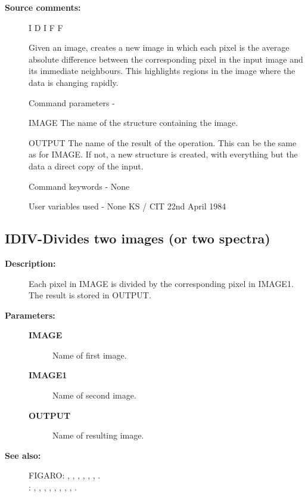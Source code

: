 \begin{description}
\begin{description}
\item [\textbf{Source comments:}]
\begin{terminalv}
 I D I F F

 Given an image, creates a new image in which each pixel
 is the average absolute difference between the corresponding
 pixel in the input image and its immediate neighbours.  This
 highlights regions in the image where the data is changing
 rapidly.

 Command parameters -

 IMAGE  The name of the structure containing the image.

 OUTPUT The name of the result of the operation.  This can
        be the same as for IMAGE.  If not, a new structure
        is created, with everything but the data a direct
        copy of the input.

 Command keywords  - None

 User variables used - None
                                  KS / CIT 22nd April 1984
\end{terminalv}
\end{description}
\subsection{IDIV-\label{IDIV}Divides two images (or two spectra)}
\begin{description}

\item [\textbf{Description:}]
 Each pixel in IMAGE is divided by the corresponding
 pixel in IMAGE1.  The result is stored in OUTPUT.

\item [\textbf{Parameters:}]
\begin{description}
\item [\textbf{IMAGE}]
 Name of first image.
\item [\textbf{IMAGE1}]
 Name of second image.
\item [\textbf{OUTPUT}]
 Name of resulting image.
\end{description}

\item [\textbf{See also:}]
FIGARO: , , , , , , .\\
: , , , , , , , , .\\


\end{description}
\end{description}
